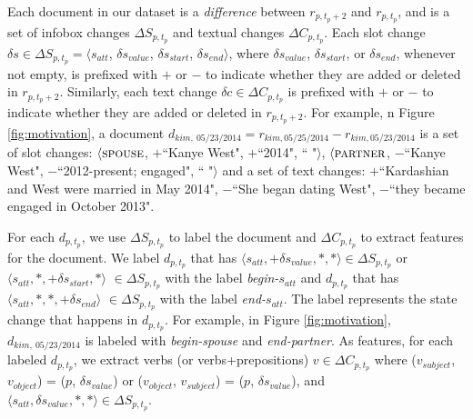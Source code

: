 Each document in our dataset is a \textit{difference} between $r_{p, t_p+2}$ and $r_{p, t_p}$, and is a set of infobox changes $\Delta S_{p, t_p}$ and textual changes $\Delta C_{p, t_p}$. Each slot change $\delta s \in \Delta S_{p, t_p} = \langle s_{att}$, $\delta s_{value}$,  $\delta s_{start}$, $\delta s_{end} \rangle$, where $\delta s_{value}$,  $\delta s_{start}$, or $\delta s_{end}$, whenever not empty, is prefixed with $+$ or $-$ to indicate whether they are added or deleted in $r_{p, t_p+2}$. Similarly, each text change $\delta c \in \Delta C_{p, t_p}$ is prefixed with $+$ or $-$ to indicate whether they are added or deleted in $r_{p, t_p+2}$. For example, n Figure \ref{fig:motivation}, a document $d_{kim,\ 05/23/2014} = r_{kim, 05/25/2014} - r_{kim, 05/23/2014}$ is a set of slot changes: $\langle\textsc{spouse}$, \textbf{$+$}\footnotesize ``Kanye West"\normalsize,  $+$\footnotesize ``2014"\normalsize, \footnotesize`` "\normalsize$\rangle$, $\langle\textsc{partner}$, $-$\footnotesize``Kanye West"\normalsize,  $-$\footnotesize``2012-present; engaged"\normalsize, \footnotesize`` "\normalsize$\rangle$ and a set of text changes: $+$\footnotesize``Kardashian and West were married in May 2014"\normalsize, $-$\footnotesize``She began dating West"\normalsize, $-$\footnotesize``they became engaged in October 2013"\normalsize.

For each $d_{p, t_p}$, we use $\Delta S_{p, t_p}$ to label the document and $\Delta C_{p, t_p}$ to extract features for the document. We label $d_{p, t_p}$ that has $\langle s_{att}, +\delta s_{value}, *, *\rangle \in \Delta S_{p, t_p}$ or $\langle s_{att}, *, +\delta s_{start}, *\rangle$ $\in \Delta S_{p, t_p}$ with the label \textit{begin-}$s_{att}$ and $d_{p, t_p}$ that has $\langle s_{att}, *, *, +\delta s_{end}\rangle$ $\in \Delta S_{p, t_p}$ with the label \textit{end-}$s_{att}$. The label represents the state change that happens in $d_{p, t_p}$. For example, in Figure \ref{fig:motivation}, $d_{kim,\ 05/23/2014}$ is labeled with \textit{begin-spouse} and \textit{end-partner}. As features, for each labeled $d_{p,t_p}$, we extract verbs (or verbs+prepositions) $v \in \Delta C_{p, t_p}$ where ($v_{subject}$, $v_{object}$) = ($p$,  $\delta s_{value}$) or ($v_{object}$, $v_{subject}$) = ($p$,  $\delta s_{value}$), and $\langle s_{att}, \delta s_{value}, *, *\rangle \in \Delta S_{p, t_p}$.


